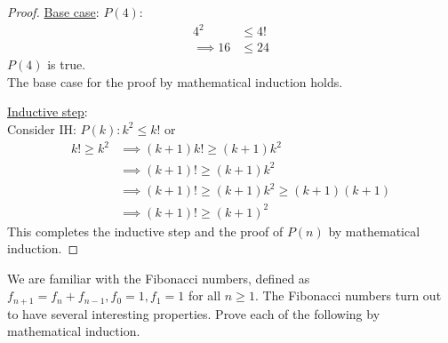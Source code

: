 \documentclass[a4paper]{exam}
\begin{document}
\begin{questions}
\begin{solution}
\begin{proof}
      \underline{Base case}: $P(4)$:\\
      \begin{align*}
        4^2  & \le 4!\\
        \implies 16  &\le 24
      \end{align*}
        $P(4)$ is true.\\
        The base case for the proof by mathematical induction holds.

      \underline{Inductive step}:\\
      Consider IH: $P(k): k^2\le k!$ or
      \begin{align*}
        k!\ge k^2 &\implies (k+1)k! \ge (k+1)k^2\\
                  &\implies (k+1)! \ge (k+1)k^2\\
                  &\implies (k+1)! \ge (k+1)k^2 \ge (k+1)(k+1)\\
                  &\implies (k+1)! \ge (k+1)^2
      \end{align*}
      This completes the inductive step and the proof of $P(n)$ by mathematical induction.
      \end{proof}
  \end{solution}

\question We are familiar with the Fibonacci numbers, defined as $f_{n+1} = f_n + f_{n-1}, f_0=1, f_1=1$ for all $n \geq 1$. The Fibonacci numbers turn out to have several interesting properties. Prove each of the following by mathematical induction.
\end{questions}
\end{document}
